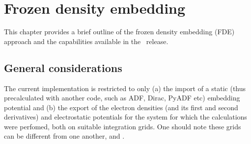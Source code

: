 \chapter{Frozen density embedding}\label{ch:fde-embedding}


This chapter provides a brief outline of the frozen density embedding (FDE) approach and
the capabilities available in the \latestrelease\ release.  

\begin{center}
\end{center} 
\section{General considerations}

The current implementation is restricted to only (a) the import of a static (thus precalculated
with another code, such as ADF, Dirac, PyADF etc) embedding potential and (b) the export of the 
electron densities (and its first and second derivatives) and electrostatic potentials for the 
system for which the calculations were perfomed, both on suitable integration grids. One should note
these grids can be different from one another, and .

